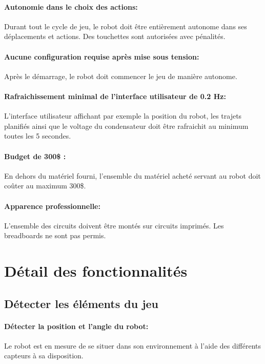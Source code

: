 \paragraph{Autonomie dans le choix des actions:}
Durant tout le cycle de jeu, le robot doit être entièrement autonome dans ses déplacements et actions. Des touchettes sont autorisées avec pénalités.

\paragraph{Aucune configuration requise après mise sous tension:}
Après le démarrage, le robot doit commencer le jeu de manière autonome.

\paragraph{Rafraichissement minimal de l'interface utilisateur de 0.2 Hz:}
L'interface utilisateur affichant par exemple la position du robot, les trajets planifiés ainsi que le voltage du condensateur doit être rafraichit au minimum toutes les 5 secondes.

\paragraph{Budget de 300\$ :}
En dehors du matériel fourni, l'ensemble du matériel acheté servant au robot doit coûter au maximum 300\$.

\paragraph{Apparence professionnelle:}
L'ensemble des circuits doivent être montés sur circuits imprimés. Les breadboards ne sont pas permis.

\section{Détail des fonctionnalités}

\subsection{Détecter les éléments du jeu}

\paragraph{Détecter la position et l'angle du robot:}
Le robot est en mesure de se situer dans son environnement à l'aide des différents capteurs à sa disposition.

